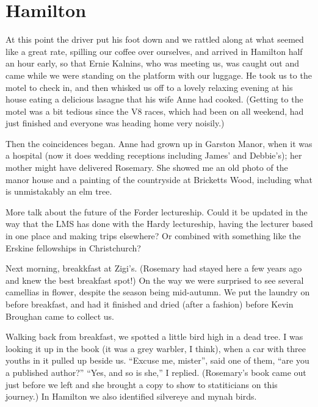 \documentclass[12pt,a4paper]{article}
\begin{document}
\section{Hamilton}

At this point the driver put his foot down and we rattled along at what
seemed like a great rate, spilling our coffee over ourselves, and arrived
in Hamilton half an hour early, so that Ernie Kalnins, who was meeting us,
was caught out and came while we were standing on the platform with our
luggage. He took us to the motel to check in, and then whisked us off to
a lovely relaxing evening at his house eating a delicious lasagne that his
wife Anne had cooked. (Getting to the motel was a bit tedious since the V8
races, which had been on all weekend, had just finished and everyone was
heading home very noisily.)

Then the coincidences began. Anne had grown up in Garston Manor, when it was
a hospital (now it does wedding receptions including James' and Debbie's);
her mother might have delivered Rosemary. She showed me an old photo of
the manor house and a painting of the countryside at Bricketts Wood, including
what is unmistakably an elm tree.

More talk about the future of the Forder lectureship. Could it be updated
in the way that the LMS has done with the Hardy lectureship, having the
lecturer based in one place and making trips elsewhere? Or combined with
something like the Erskine fellowships in Christchurch?

Next morning, breakkfast at Zigi's. (Rosemary had stayed here a few years
ago and knew the best breakfast spot!) On the way we were surprised to see
several camellias in flower, despite the season being mid-autumn. We put 
the laundry on before breakfast, and had it finished and dried (after a
fashion) before Kevin Broughan came to collect us.

Walking back from breakfast, we spotted a little bird high in a dead tree.
I was looking it up in the book (it was a grey warbler, I think), when a
car with three youths in it pulled up beside us. ``Excuse me, mister'', said
one of them, ``are you a published author?'' ``Yes, and so is she,'' I replied.
(Rosemary's book came out just before we left and she brought a copy to
show to statiticians on this journey.) In Hamilton we also identified
silvereye and mynah birds.
\end{document}
